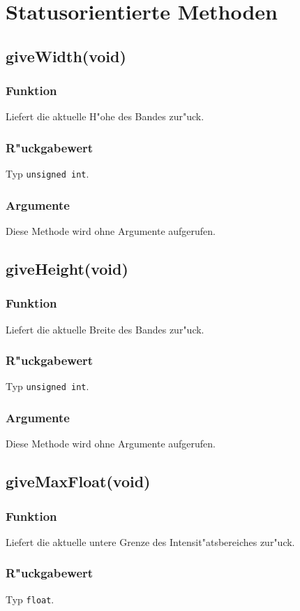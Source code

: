 \documentclass[12pt,a4paper,draft,twoside,onecolumn,titlepage]{book}
\newcommand{\ctyp}[1]{{\tt #1}}
\newcommand{\arglist}[1]{\footnotesize{#1}}
\begin{document}
\section{Statusorientierte Methoden}
\label{ebbandorgm}
\subsection{giveWidth\arglist{(void)}}
\subsubsection{Funktion}
Liefert die aktuelle H"ohe des Bandes zur"uck.
\subsubsection{R"uckgabewert}
Typ \ctyp{unsigned int}.
\subsubsection{Argumente}
Diese Methode wird ohne Argumente aufgerufen.
\subsection{giveHeight\arglist{(void)}}
\subsubsection{Funktion}
Liefert die aktuelle Breite des Bandes zur"uck.
\subsubsection{R"uckgabewert}
Typ \ctyp{unsigned int}.
\subsubsection{Argumente}
Diese Methode wird ohne Argumente aufgerufen.
\subsection{giveMaxFloat\arglist{(void)}}
\subsubsection{Funktion}
Liefert die aktuelle untere Grenze des Intensit"atsbereiches zur"uck.
\subsubsection{R"uckgabewert}
Typ \ctyp{float}.
\end{document}
